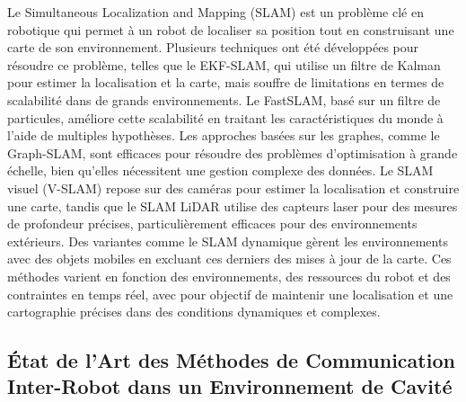 \documentclass[../main.tex]{subfiles}
\begin{document}
Le Simultaneous Localization and Mapping (SLAM) est un problème clé en robotique qui permet à un robot de localiser sa position tout en construisant une carte de son environnement. Plusieurs techniques ont été développées pour résoudre ce problème, telles que le EKF-SLAM, qui utilise un filtre de Kalman pour estimer la localisation et la carte, mais souffre de limitations en termes de scalabilité dans de grands environnements. Le FastSLAM, basé sur un filtre de particules, améliore cette scalabilité en traitant les caractéristiques du monde à l'aide de multiples hypothèses. Les approches basées sur les graphes, comme le Graph-SLAM, sont efficaces pour résoudre des problèmes d'optimisation à grande échelle, bien qu'elles nécessitent une gestion complexe des données. Le SLAM visuel (V-SLAM) repose sur des caméras pour estimer la localisation et construire une carte, tandis que le SLAM LiDAR utilise des capteurs laser pour des mesures de profondeur précises, particulièrement efficaces pour des environnements extérieurs. Des variantes comme le SLAM dynamique gèrent les environnements avec des objets mobiles en excluant ces derniers des mises à jour de la carte. Ces méthodes varient en fonction des environnements, des ressources du robot et des contraintes en temps réel, avec pour objectif de maintenir une localisation et une cartographie précises dans des conditions dynamiques et complexes.


\subsection{État de l'Art des Méthodes de Communication Inter-Robot dans un Environnement de Cavité}
\end{document}
